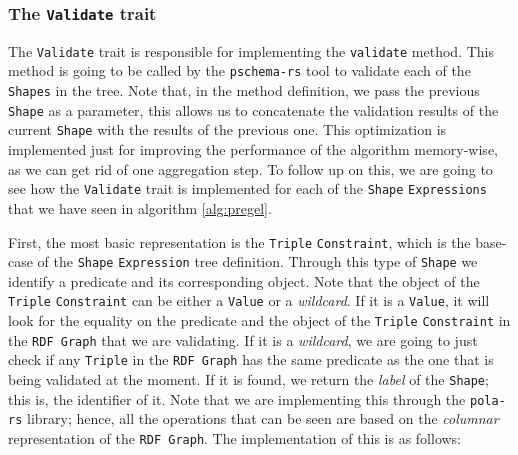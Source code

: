 \label{section:validate_trait}
\subsubsection{The \texttt{Validate} trait}

The \texttt{Validate} trait is responsible for implementing the \texttt{validate} method. This method is going to be called by the \texttt{pschema-rs} tool to validate each of the \texttt{Shapes} in the tree. Note that, in the method definition, we pass the previous \texttt{Shape} as a parameter, this allows us to concatenate the validation results of the current \texttt{Shape} with the results of the previous one. This optimization is implemented just for improving the performance of the algorithm memory-wise, as we can get rid of one aggregation step. To follow up on this, we are going to see how the \texttt{Validate} trait is implemented for each of the \texttt{Shape} \texttt{Expressions} that we have seen in algorithm \ref{alg:pregel}.

First, the most basic representation is the \texttt{Triple} \texttt{Constraint}, which is the base-case of the \texttt{Shape} \texttt{Expression} tree definition. Through this type of \texttt{Shape} we identify a predicate and its corresponding object. Note that the object of the \texttt{Triple} \texttt{Constraint} can be either a \texttt{Value} or a \textit{wildcard}. If it is a \texttt{Value}, it will look for the equality on the predicate and the object of the \texttt{Triple} \texttt{Constraint} in the \texttt{RDF Graph} that we are validating. If it is a \textit{wildcard}, we are going to just check if any \texttt{Triple} in the \texttt{RDF Graph} has the same predicate as the one that is being validated at the moment. If it is found, we return the \textit{label} of the \texttt{Shape}; this is, the identifier of it. Note that we are implementing this through the \texttt{pola-rs} library; hence, all the operations that can be seen are based on the \textit{columnar} representation of the \texttt{RDF Graph}. The implementation of this is as follows:

\begin{code}
    \inputminted{rust}{code/listings/11-10_triple.rs}
\end{code}

